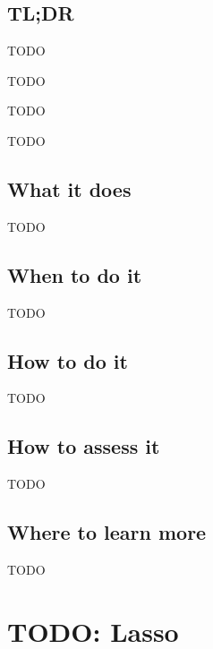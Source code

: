\documentclass[
]{book}
\providecommand{\tightlist}{%
  \setlength{\itemsep}{0pt}\setlength{\parskip}{0pt}}
\begin{document}
\hypertarget{tldr-12}{%
\section{TL;DR}\label{tldr-12}}

\begin{description}
\tightlist
\item[What it does]
TODO
\item[When to do it]
TODO
\item[How to do it]
TODO
\item[How to assess it]
TODO
\end{description}

\hypertarget{what-it-does-12}{%
\section{What it does}\label{what-it-does-12}}

TODO

\hypertarget{when-to-do-it-12}{%
\section{When to do it}\label{when-to-do-it-12}}

TODO

\hypertarget{how-to-do-it-12}{%
\section{How to do it}\label{how-to-do-it-12}}

TODO

\hypertarget{how-to-assess-it-12}{%
\section{How to assess it}\label{how-to-assess-it-12}}

TODO

\hypertarget{where-to-learn-more-12}{%
\section{Where to learn more}\label{where-to-learn-more-12}}

TODO

\hypertarget{lasso}{%
\chapter{TODO: Lasso}\label{lasso}}
\end{document}
